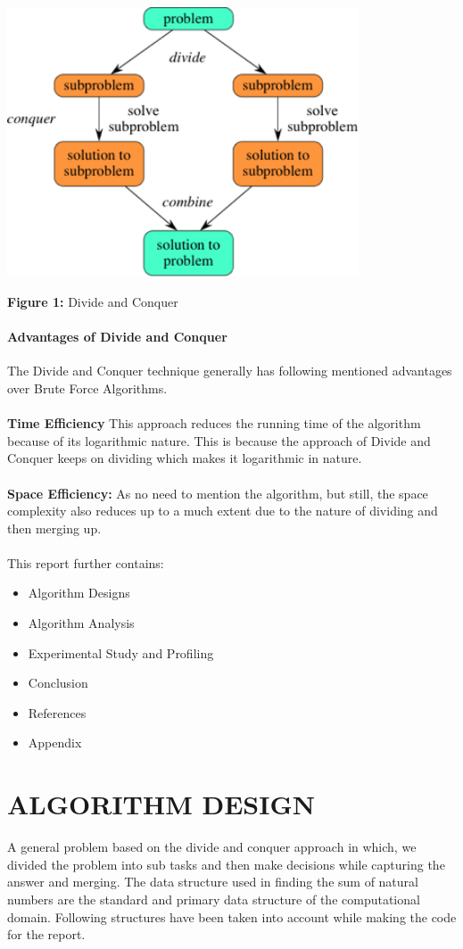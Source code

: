 \documentclass[10pt]{article}
\begin{document}
\begin{multicols*}{2}
\includegraphics[width=\columnwidth, height=8cm]{dandc.png}\begin{center}\textbf{Figure 1:} Divide and Conquer\end{center}


\paragraph{Advantages of Divide and Conquer}
The Divide and Conquer technique generally has following mentioned advantages over Brute Force Algorithms.\\\\
\textbf{Time Efficiency} This approach reduces the running time of the algorithm because of its logarithmic nature. This is because the approach of Divide and Conquer keeps on dividing which makes it logarithmic in nature.\\\\
\textbf{Space Efficiency:} As no need to mention the algorithm,  but still, the space complexity also reduces up to a much extent due to the nature of dividing and then merging up.\\

\\This report further contains:
\begin{itemize}
\item 	Algorithm  Designs
\item 	Algorithm  Analysis
\item 	Experimental Study and Profiling
\item 	Conclusion
\item 	References
\item 	Appendix
\end{itemize}

\section*{ALGORITHM DESIGN}
A general problem based on the divide and conquer approach in which, we divided the problem into sub tasks and then make decisions while capturing the answer and merging. The data structure used in finding the sum of natural numbers are the standard and primary data structure of the computational domain. Following structures have been taken into account while making the code for the report.


\end{multicols*}
\end{document}
